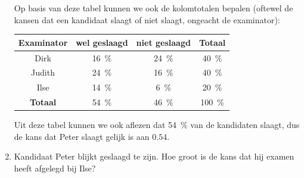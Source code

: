 \begin{enumerate}[label=(\alph*)]
{        Op basis van deze tabel kunnen we ook de kolomtotalen bepalen (oftewel de kansen dat een kandidaat slaagt of niet slaagt, ongeacht de examinator):
        \begin{center}
            \begin{tabular}{c|cc|c}
                \toprule
                    Examinator & wel geslaagd & niet geslaagd & \textbf{Totaal}\\
                \midrule 
                    Dirk   & \SI{16}{\percent} & \SI{24}{\percent} & \SI{40}{\percent} \\
                    Judith & \SI{24}{\percent} & \SI{16}{\percent} & \SI{40}{\percent} \\
                    Ilse   & \SI{14}{\percent} & \SI{6}{\percent} & \SI{20}{\percent} \\
                \midrule
                    \textbf{Totaal} & \SI{54}{\percent} & \SI{46}{\percent} & \SI{100}{\percent} \\
                \bottomrule
            \end{tabular}
        \end{center}
        Uit deze tabel kunnen we ook aflezen dat \SI{54}{\percent} van de kandidaten slaagt, dus de kans dat Peter slaagt gelijk is aan $0.54$.
    }   
    
    \item Kandidaat Peter blijkt geslaagd te zijn. Hoe groot is de kans dat hij examen heeft afgelegd bij Ilse?
\end{enumerate}

